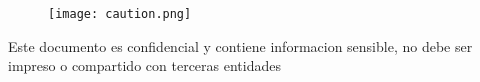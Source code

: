 \documentclass[a4paper]{article}
\begin{document}
    
    \begin{figure}
        \centering
        \null\par\vspace{2cm}
        \texttt{[image: caution.png]}
    \end{figure}

    \null\par\vspace{2cm}
    \begin{center}
        \begin{tcolorbox}[colback=red!5!white, colframe=color_recuadro]
            \Large Este documento es confidencial y contiene informacion sensible, no debe ser impreso o compartido con terceras entidades 
            
        \end{tcolorbox}
    \end{center}
\end{document}
